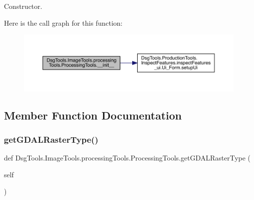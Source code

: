 \begin{DoxyVerb}Constructor.\end{DoxyVerb}
 Here is the call graph for this function\+:
\nopagebreak
\begin{figure}[H]
\begin{center}
\leavevmode
\includegraphics[width=350pt]{class_dsg_tools_1_1_image_tools_1_1processing_tools_1_1_processing_tools_a5ebd71ec68e98d15a543a3b7a17674f4_cgraph}
\end{center}
\end{figure}


\subsection{Member Function Documentation}
\mbox{\label{class_dsg_tools_1_1_image_tools_1_1processing_tools_1_1_processing_tools_a3463e8196d90002c4324ebb84a8f5bc9}} 
\subsubsection{\texorpdfstring{get\+G\+D\+A\+L\+Raster\+Type()}{getGDALRasterType()}}
{\footnotesize\ttfamily def Dsg\+Tools.\+Image\+Tools.\+processing\+Tools.\+Processing\+Tools.\+get\+G\+D\+A\+L\+Raster\+Type (\begin{DoxyParamCaption}\item[{}]{self }\end{DoxyParamCaption})}

